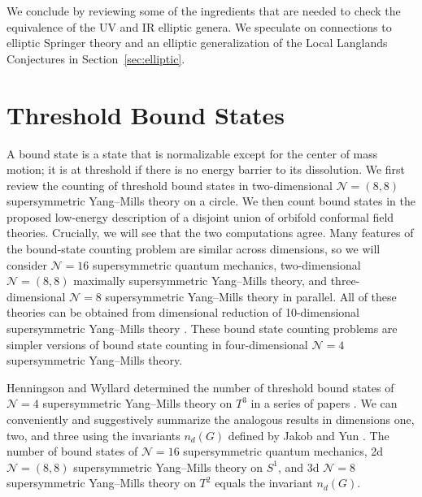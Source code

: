 \documentclass[12pt]{article}
\numberwithin{equation}{section}%
\theoremstyle{definition}
\newcommand{\cN}{\mathcal{N}}
\begin{document}
We conclude by reviewing some of the ingredients that are needed to check the equivalence of the UV and IR elliptic genera. We speculate on connections to elliptic Springer theory and an elliptic generalization of the Local Langlands Conjectures in Section~\ref{sec:elliptic}.

\section{Threshold Bound States}
\label{sec:threshold}
A bound state is a state that is normalizable except for the center of mass motion; it is at threshold if there is no energy barrier to its dissolution.
We first review the counting of threshold bound states in two-dimensional $\cN=(8,8)$ supersymmetric Yang--Mills theory on a circle.  We then count bound states in the proposed low-energy description of a disjoint union of orbifold conformal field theories.  Crucially, we will see that the two computations agree.
Many features of the bound-state counting problem are similar across dimensions, so we will consider $\cN = 16$ supersymmetric quantum mechanics, two-dimensional $\cN = (8,8)$ maximally supersymmetric Yang--Mills theory, and three-dimensional $\cN = 8$ supersymmetric Yang--Mills theory in parallel.  All of these theories can be obtained from dimensional reduction of 10-dimensional supersymmetric Yang--Mills theory \cite{Brink:1976bc}.  These bound state counting problems are simpler versions of bound state counting in four-dimensional $\cN = 4$ supersymmetric Yang--Mills theory.
  
Henningson and Wyllard determined the number of threshold bound states of $\cN=4$ supersymmetric Yang--Mills theory on $T^3$ in a series of papers \cite{Henningson:2007dq, Henningson:2007qr, Henningson:2008ri}.  We can conveniently and suggestively summarize the analogous results in dimensions one, two, and three using the invariants $n_d(G)$ defined by Jakob and Yun \cite{jakob2024countingabsolutelyindecomposablegbundles}.
The number of bound states of $\mathcal{N} = 16$ supersymmetric quantum mechanics, 2d $\mathcal{N} = (8,8)$ supersymmetric Yang--Mills theory on $S^1$, and 3d $\mathcal{N} = 8$ supersymmetric Yang--Mills theory on $T^2$ equals the invariant $n_d(G).$
\end{document}
